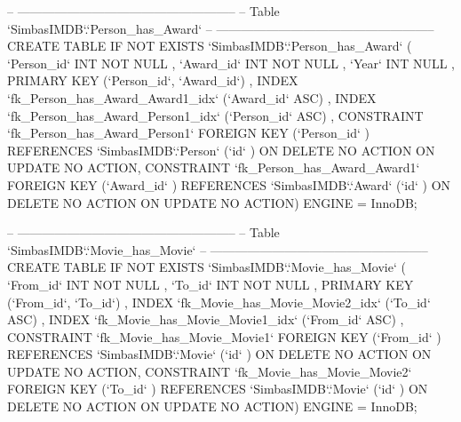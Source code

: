 \begin{spverbatim}
-- -----------------------------------------------------
-- Table `SimbasIMDB`.`Person_has_Award`
-- -----------------------------------------------------
CREATE  TABLE IF NOT EXISTS `SimbasIMDB`.`Person_has_Award` (
  `Person_id` INT NOT NULL ,
  `Award_id` INT NOT NULL ,
  `Year` INT NULL ,
  PRIMARY KEY (`Person_id`, `Award_id`) ,
  INDEX `fk_Person_has_Award_Award1_idx` (`Award_id` ASC) ,
  INDEX `fk_Person_has_Award_Person1_idx` (`Person_id` ASC) ,
  CONSTRAINT `fk_Person_has_Award_Person1`
    FOREIGN KEY (`Person_id` )
    REFERENCES `SimbasIMDB`.`Person` (`id` )
    ON DELETE NO ACTION
    ON UPDATE NO ACTION,
  CONSTRAINT `fk_Person_has_Award_Award1`
    FOREIGN KEY (`Award_id` )
    REFERENCES `SimbasIMDB`.`Award` (`id` )
    ON DELETE NO ACTION
    ON UPDATE NO ACTION)
ENGINE = InnoDB;


-- -----------------------------------------------------
-- Table `SimbasIMDB`.`Movie_has_Movie`
-- -----------------------------------------------------
CREATE  TABLE IF NOT EXISTS `SimbasIMDB`.`Movie_has_Movie` (
  `From_id` INT NOT NULL ,
  `To_id` INT NOT NULL ,
  PRIMARY KEY (`From_id`, `To_id`) ,
  INDEX `fk_Movie_has_Movie_Movie2_idx` (`To_id` ASC) ,
  INDEX `fk_Movie_has_Movie_Movie1_idx` (`From_id` ASC) ,
  CONSTRAINT `fk_Movie_has_Movie_Movie1`
    FOREIGN KEY (`From_id` )
    REFERENCES `SimbasIMDB`.`Movie` (`id` )
    ON DELETE NO ACTION
    ON UPDATE NO ACTION,
  CONSTRAINT `fk_Movie_has_Movie_Movie2`
    FOREIGN KEY (`To_id` )
    REFERENCES `SimbasIMDB`.`Movie` (`id` )
    ON DELETE NO ACTION
    ON UPDATE NO ACTION)
ENGINE = InnoDB;
\end{spverbatim}
\newpage
